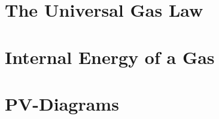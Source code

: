 	
	\section{The Universal Gas Law}
	\section{Internal Energy of a Gas}
	\section{PV-Diagrams}
	
	


